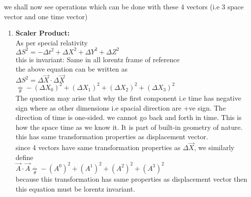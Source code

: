 \documentclass[11pt,a4paper]{article}
\begin{document}
\begin{enumerate}
\begin{enumerate}
                    we shall now see operations which can be done with these 4 vectors (i.e 3 space vector and one time vector)
                    \begin{enumerate}
                        \item \textbf{Scaler Product:}\\
                              As per special relativity\\
                              $\Delta{S^2}=-\Delta{t^2}+\Delta{X^2}+\Delta{Y^2}+\Delta{Z^2}$\\
                              this is invariant: Same in all lorentz frame of reference\\
                              the above equation can be written as\\
                              $\Delta{S^2} = \Delta \vec{X} \cdot \Delta\vec{X}$\\
                              $\mathop = \limits^{.}_{\theta}  -(\Delta{X_0})^2+(\Delta{X_1})^2+(\Delta{X_2})^2+(\Delta{X_3})^2$\\
                              The question may arise that why the first component i.e time has negative sign where as other dimensions i.e spacial direction are +ve sign. The direction of time is one-sided. we cannot go back and forth in time. This is how the space time as we know it. It is part of built-in geometry of nature.\\
                              this has same transformation properties as displacement vector.\\
                              since 4 vectors have same transformation properties as $\Delta \vec{X}$, we similarly define\\
                              $\vec{A}\cdot\vec{A} \mathop = \limits^{.}_{\theta} - (A^0)^2 + (A^1)^2+ (A^2)^2+ (A^3)^2$\\
                              because this transformation has same properties as displacement vector then this equation must be lorentz invariant.


\end{enumerate}
\end{enumerate}
\end{enumerate}
\end{document}
